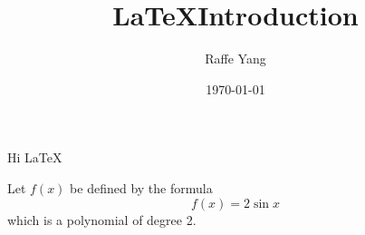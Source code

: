 \documentclass{article} %
\title{\LaTeX Introduction}
\author{Raffe Yang}
\date{\today} %
\begin{document}
    \maketitle %
    
    Hi \LaTeX
    
    Let $f(x)$ be defined by the formula $$f(x)=2\sin x$$ which is a polynomial of degree 2.
    
\end{document}
